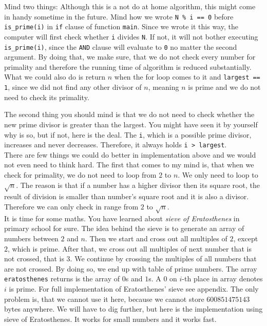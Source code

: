 \documentclass{book}
\begin{document}
Mind two things: Although this is a not do at home algorithm, this might come in handy sometime in the future. Mind how we wrote \texttt{N \% i == 0} before \texttt{is\_prime(i)} in \texttt{if} clause of function \texttt{main}. Since we wrote it this way, the computer will first check whether \texttt{i} divides \texttt{N}. If not, it will not bother executing \texttt{is\_prime(i)}, since the \texttt{AND} clause will evaluate to \texttt{0} no matter the second argument. By doing that, we make sure, that we do not check every number for primality and therefore the running time of algorithm is reduced substantially. What we could also do is return $n$ when the for loop comes to it and \texttt{largest == 1}, since we did not find any other divisor of $n$, meaning $n$ is prime and we do not need to check its primality.

The second thing you should mind is that we do not need to check whether the new prime divisor is greater than the largest. You might have seen it by yourself why is so, but if not, here is the deal. The \texttt{i}, which is a possible prime divisor, increases and never decreases. Therefore, it always holds \texttt{i > largest}.\\

There are few things we could do better in implementation above and we would not even need to think hard. The first that comes to my mind is, that when we check for primality, we do not need to loop from $2$ to $n$. We only need to loop to $\sqrt{n}$. The reason is that if a number has a higher divisor then its square root, the result of division is smaller than number's square root and it is also a divisor. Therefore we can only check in range from $2$ to $\sqrt{n}$.\\

It is time for some maths. You have learned about \textit{sieve of Eratosthenes} in primary school for sure. The idea behind the sieve is to generate an array of numbers between $2$ and $n$. Then we start and cross out all multiples of $2$, except $2$, which is prime. After that, we cross out all multiples of next number that is not crossed, that is $3$. We continue by crossing the multiples of all numbers that are not crossed. By doing so, we end up with table of prime numbers. The array \texttt{eratosthenes} returns is the array of $0$s and $1$s. A $0$ on $i$-th place in array denotes $i$ is prime. For full implementation of Eratosthenes' sieve see appendix. The only problem is, that we cannot use it here, because we cannot store $600851475143$ bytes anywhere. We will have to dig further, but here is the implementation using sieve of Eratosthenes. It works for small numbers and it works fast.
\end{document}
